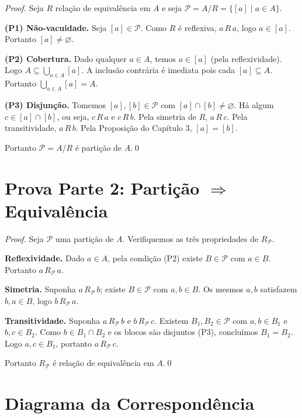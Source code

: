 \documentclass[12pt,a4paper]{book}
\begin{document}
\begin{proof}
Seja $R$ relação de equivalência em $A$ e seja $\mathcal{P} = A/R = \{[a] \mid a \in A\}$.

\textbf{(P1) Não-vacuidade.} Seja $[a] \in \mathcal{P}$. Como $R$ é reflexiva, $a\,R\,a$, logo $a \in [a]$. Portanto $[a] \neq \varnothing$.

\textbf{(P2) Cobertura.} Dado qualquer $a \in A$, temos $a \in [a]$ (pela reflexividade). Logo $A \subseteq \bigcup_{a \in A} [a]$. A inclusão contrária é imediata pois cada $[a] \subseteq A$. Portanto $\bigcup_{a \in A} [a] = A$.

\textbf{(P3) Disjunção.} Tomemos $[a], [b] \in \mathcal{P}$ com $[a] \cap [b] \neq \varnothing$. Há algum $c \in [a] \cap [b]$, ou seja, $c\,R\,a$ e $c\,R\,b$. Pela simetria de $R$, $a\,R\,c$. Pela transitividade, $a\,R\,b$. Pela Proposição do Capítulo 3, $[a] = [b]$.

Portanto $\mathcal{P} = A/R$ é partição de $A$.\qed
\end{proof}

\section{Prova Parte 2: Partição $\Rightarrow$ Equivalência}

\begin{proof}
Seja $\mathcal{P}$ uma partição de $A$. Verifiquemos as três propriedades de $R_\mathcal{P}$.

\textbf{Reflexividade.} Dado $a \in A$, pela condição (P2) existe $B \in \mathcal{P}$ com $a \in B$. Portanto $a\,R_\mathcal{P}\,a$.

\textbf{Simetria.} Suponha $a\,R_\mathcal{P}\,b$; existe $B \in \mathcal{P}$ com $a, b \in B$. Os mesmos $a, b$ satisfazem $b, a \in B$, logo $b\,R_\mathcal{P}\,a$.

\textbf{Transitividade.} Suponha $a\,R_\mathcal{P}\,b$ e $b\,R_\mathcal{P}\,c$. Existem $B_1, B_2 \in \mathcal{P}$ com $a,b \in B_1$ e $b,c \in B_2$. Como $b \in B_1 \cap B_2$ e os blocos são disjuntos (P3), concluímos $B_1 = B_2$. Logo $a, c \in B_1$, portanto $a\,R_\mathcal{P}\,c$.

Portanto $R_\mathcal{P}$ é relação de equivalência em $A$.\qed
\end{proof}

\section{Diagrama da Correspondência}
\end{document}
